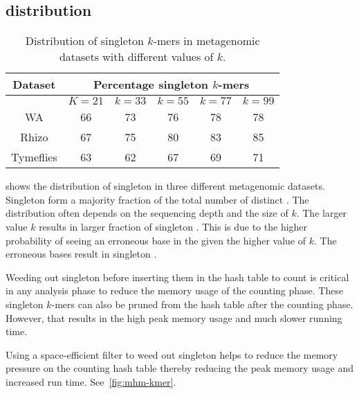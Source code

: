 
\subsection{\Kmer distribution}

\begin{wraptable}{r}{4.5in}
\centering
    \begin{tabular}{c | c | c | c | c | c}
    \toprule
    \textbf{Dataset} & \multicolumn{5}{c}{\textbf{Percentage singleton $k$-mers}} \\
    \midrule
    & $K=21$ & $k=33$ & $k=55$ & $k=77$ & $k=99$ \\
    \midrule
    WA &  66 & 73 & 76 & 78 & 78  \\
    Rhizo &  67 & 75 & 80 & 83 & 85  \\
    Tymeflies & 63 & 62 & 67 & 69 & 71 \\
    \bottomrule
    \end{tabular}
    \caption{Distribution of singleton $k$-mers in metagenomic datasets with different values of $k$.}
    \label{tab:kmer-dist}
\end{wraptable}

 shows the distribution of singleton \kmers in three
different metagenomic datasets. Singleton \kmers form a majority fraction of
the total number of distinct \kmers. The distribution often depends on the
sequencing depth and the size of $k$. The larger value $k$ results in larger
fraction of singleton \kmers. This is due to the higher probability of seeing
an erroneous base in the \kmer given the higher value of $k$. The erroneous
bases result in singleton \kmers.

Weeding out singleton \kmers before inserting them in the hash table to count
is critical in any \kmer analysis phase to reduce the memory usage of the
counting phase. These singleton $k$-mers can also be pruned from the hash table
after the counting phase. However, that results in the high peak memory usage
and much slower running time.

Using a space-efficient filter to weed out singleton \kmers helps to reduce
the memory pressure on the counting hash table thereby reducing the peak memory
usage and increased run time. See~\cref{fig:mhm-kmer}.
